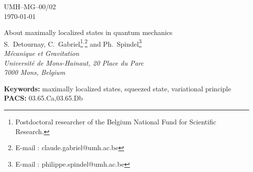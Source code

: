 \documentclass[a4paper,10pt]{article}
\begin{document}
\begin{flushright} UMH--MG--00/02 \\\today\\ \end{flushright}
\vspace{.1cm}
\begin{center} {\large About maximally localized states in quantum mechanics}\\
\vspace{.5cm} S.~Detournay, C.~Gabriel\footnote{Postdoctoral
researcher of the Belgium National Fund for Scientific
Research.}$^,$\footnote{ E-mail : claude.gabriel@umh.ac.be} and
Ph.~Spindel\footnote{ E-mail :
philippe.spindel@umh.ac.be}\\
\vspace{.2cm} {\it M\'ecanique et Gravitation}\\ {\it Universit\'e
de Mons-Hainaut, 20 Place du Parc}\\ {\it 7000 Mons, Belgium}\\
\end{center} \vspace{.1cm}



\begin{abstract}
We analyze the emergence of a minimal length for a large class of
generalized commutation relations, preserving commutation of the
position operators and translation invariance as well as rotation
invariance (in dimension higher than one). We show that the
construction of the maximally localized states based on squeezed
states generally fails. Rather, one must resort to a constrained
variational principle.
\end{abstract}
{\small {\bf Keywords: }{maximally localized states, squeezed
state,
variational principle}\\
{\bf PACS: }{03.65.Ca,03.65.Db}}
\end{document}
